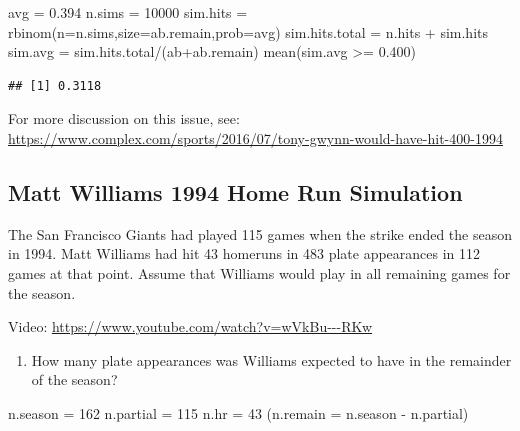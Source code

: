 \documentclass[
  11pt,
]{book}
\newenvironment{Shaded}{\begin{snugshade}}{\end{snugshade}}
\newcommand{\AttributeTok}[1]{\textcolor[rgb]{0.77,0.63,0.00}{#1}}
\newcommand{\DecValTok}[1]{\textcolor[rgb]{0.00,0.00,0.81}{#1}}
\newcommand{\FloatTok}[1]{\textcolor[rgb]{0.00,0.00,0.81}{#1}}
\newcommand{\FunctionTok}[1]{\textcolor[rgb]{0.00,0.00,0.00}{#1}}
\newcommand{\NormalTok}[1]{#1}
\newcommand{\OtherTok}[1]{\textcolor[rgb]{0.56,0.35,0.01}{#1}}
\newcommand{\SpecialCharTok}[1]{\textcolor[rgb]{0.00,0.00,0.00}{#1}}
\providecommand{\tightlist}{%
  \setlength{\itemsep}{0pt}\setlength{\parskip}{0pt}}
\theoremstyle{definition}
\theoremstyle{definition}
\theoremstyle{definition}
\theoremstyle{definition}
\theoremstyle{remark}
\begin{document}
\begin{Shaded}
\begin{Highlighting}[]
\NormalTok{avg }\OtherTok{=} \FloatTok{0.394}
\NormalTok{n.sims }\OtherTok{=} \DecValTok{10000}
\NormalTok{sim.hits }\OtherTok{=} \FunctionTok{rbinom}\NormalTok{(}\AttributeTok{n=}\NormalTok{n.sims,}\AttributeTok{size=}\NormalTok{ab.remain,}\AttributeTok{prob=}\NormalTok{avg)}
\NormalTok{sim.hits.total }\OtherTok{=}\NormalTok{ n.hits }\SpecialCharTok{+}\NormalTok{ sim.hits}
\NormalTok{sim.avg }\OtherTok{=}\NormalTok{ sim.hits.total}\SpecialCharTok{/}\NormalTok{(ab}\SpecialCharTok{+}\NormalTok{ab.remain)}
\FunctionTok{mean}\NormalTok{(sim.avg }\SpecialCharTok{\textgreater{}=} \FloatTok{0.400}\NormalTok{)}
\end{Highlighting}
\end{Shaded}

\begin{verbatim}
## [1] 0.3118
\end{verbatim}

For more discussion on this issue, see: \url{https://www.complex.com/sports/2016/07/tony-gwynn-would-have-hit-400-1994}

\hypertarget{matt-williams-1994-home-run-simulation}{%
\subsection{Matt Williams 1994 Home Run Simulation}\label{matt-williams-1994-home-run-simulation}}

The San Francisco Giants had played 115 games when the strike ended the season in 1994. Matt Williams had hit 43 homeruns in 483 plate appearances in 112 games at that point. Assume that Williams would play in all remaining games for the season.

Video: \url{https://www.youtube.com/watch?v=wVkBu---RKw}

\begin{enumerate}
\def\labelenumi{(\alph{enumi})}
\tightlist
\item
  How many plate appearances was Williams expected to have in the remainder of the season?
\end{enumerate}

\begin{Shaded}
\begin{Highlighting}[]
\NormalTok{n.season }\OtherTok{=} \DecValTok{162}
\NormalTok{n.partial }\OtherTok{=} \DecValTok{115}
\NormalTok{n.hr }\OtherTok{=} \DecValTok{43}
\NormalTok{(}\AttributeTok{n.remain =}\NormalTok{ n.season }\SpecialCharTok{{-}}\NormalTok{ n.partial)}
\end{Highlighting}
\end{Shaded}
\end{document}
